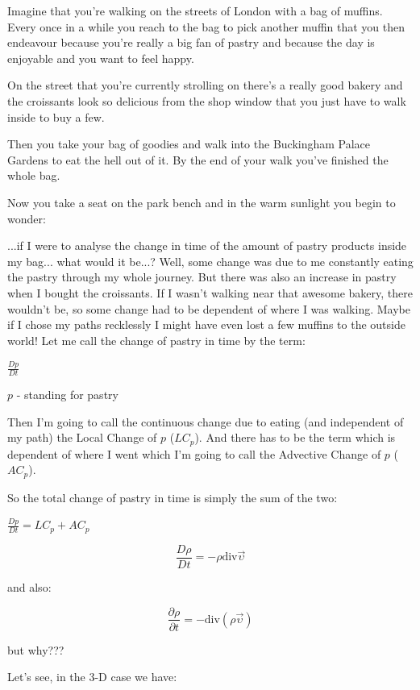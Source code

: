 \documentclass[12pt]{report}
\begin{document}
Imagine that you're walking on the streets of London with a bag of muffins. Every once in a while you reach to the bag to pick another muffin that you then endeavour because you're really a big fan of pastry and because the day is enjoyable and you want to feel happy.

On the street that you're currently strolling on there's a really good bakery and the croissants look so delicious from the shop window that you just have to walk inside to buy a few.

Then you take your bag of goodies and walk into the Buckingham Palace Gardens to eat the hell out of it. By the end of your walk you've finished the whole bag.

Now you take a seat on the park bench and in the warm sunlight you begin to wonder:

...if I were to analyse the change in time of the amount of pastry products inside my bag... what would it be...? Well, some change was due to me constantly eating the pastry through my whole journey. But there was also an increase in pastry when I bought the croissants. If I wasn't walking near that awesome bakery, there wouldn't be, so some change had to be dependent of where I was walking. Maybe if I chose my paths recklessly I might have even lost a few muffins to the outside world! Let me call the change of pastry in time by the term:

$\frac{Dp}{Dt}$

$p$ - standing for pastry

Then I'm going to call the continuous change due to eating (and independent of my path) the Local Change of $p$ ($LC_p$). And there has to be the term which is dependent of where I went which I'm going to call the Advective Change of $p$ ($AC_p$).

So the total change of pastry in time is simply the sum of the two:

$\frac{Dp}{Dt} = LC_p + AC_p$

\begin{equation}
\frac{D \rho}{D t} = - \rho \text{div} \vec{\upsilon}
\end{equation}

and also:

\begin{equation}
\frac{\partial \rho}{\partial t} = - \text{div} (\rho \vec{\upsilon})
\end{equation}

but why???

Let's see, in the 3-D case we have:
\end{document}
